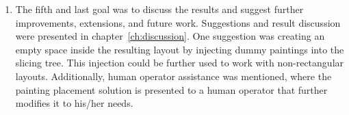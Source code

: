 \begin{enumerate}
    \item  The fifth and last goal was to discuss the results and suggest further improvements, extensions, and future work.
    Suggestions and result discussion were presented in chapter~\ref{ch:discussion}.
    One suggestion was creating an empty space inside the resulting layout by injecting dummy paintings into the slicing tree.
    This injection could be further used to work with non-rectangular layouts.
    Additionally, human operator assistance was mentioned, where the painting placement solution is presented to a human operator
    that further modifies it to his/her needs.

\end{enumerate}
